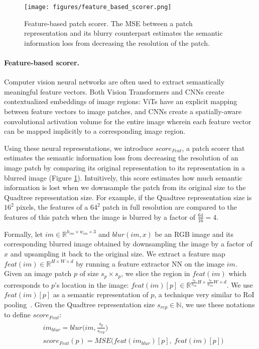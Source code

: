 \begin{figure}[t!]
  \centering
  \vspace*{-10pt}
  \texttt{[image: figures/feature\_based\_scorer.png]}
  \caption{Feature-based patch scorer. The MSE between a patch representation and its blurry counterpart estimates the semantic information loss from decreasing the resolution of the patch.}
  \label{figure:feature_based_scorer}
\end{figure}


\paragraph{Feature-based scorer.}\label{paragraph:feature_based_scorer}
Computer vision neural networks are often used to extract semantically meaningful feature vectors. Both Vision Transformers and CNNs create contextualized embeddings of image regions: ViTs have an explicit mapping between feature vectors to image patches, and CNNs create a spatially-aware convolutional activation volume for the entire image wherein each feature vector can be mapped implicitly to a corresponding image region.

Using these neural representations, we introduce $score_{Feat}$, a patch scorer that estimates the semantic information loss from decreasing the resolution of an image patch by comparing its original representation to its representation in a blurred image (Figure \ref{figure:feature_based_scorer}). Intuitively, this score estimates how much semantic information is lost when we downsample the patch from its original size to the Quadtree representation size. For example, if the Quadtree representation size is $16^2$ pixels, the features of a $64^2$ patch in full resolution are compared to the features of this patch when the image is blurred by a factor of $\frac{64}{16}=4$.

Formally,  let $im\in\mathbb{R}^{h_{im} \times w_{im} \times 3}$ and $blur(im, x)$ be an RGB image and its corresponding blurred image obtained by downsampling the image by a factor of $x$ and upsampling it back to the original size. We extract a feature map $feat(im)\in\mathbb{R}^{H \times W \times d}$ by running a feature extractor NN on the image $im$. Given an image patch $p$ of size $s_p \times s_p$, we slice the region in $feat(im)$ which corresponds to $p$'s location in the image: $feat(im)[p]\in\mathbb{R}^{\frac{s_p}{h_{im}}H \times \frac{s_p}{w_{im}}W \times d}$. We use $feat(im)[p]$ as a semantic representation of $p$, a technique very similar to RoI pooling~\cite{Girshick2015FastR}. Given the Quadtree representation size $s_{rep} \in \mathbb{N}$, we use these notations to \linebreak define $score_{Feat}$:
\begin{align}
\begin{aligned}
&im_{blur} = blur \bigl( im,\frac{s_p}{s_{rep}} \bigr)  \\
&score_{Feat}(p) = MSE \bigl( feat(im_{blur})[p],~feat(im)[p] \bigr)
\end{aligned}
\label{equation:feature_base_scorer}
\end{align}



